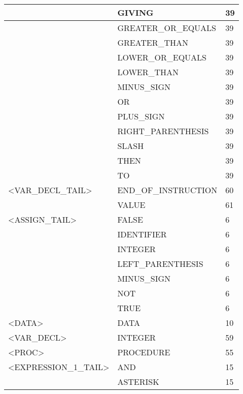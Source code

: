 \begin{longtable}{|l|l|l|}
                     &   GIVING               &   39 \\ \hline
                     &   GREATER\_OR\_EQUALS    &   39 \\ \hline
                     &   GREATER\_THAN         &   39 \\ \hline
                     &   LOWER\_OR\_EQUALS      &   39 \\ \hline
                     &   LOWER\_THAN           &   39 \\ \hline
                     &   MINUS\_SIGN           &   39 \\ \hline
                     &   OR                   &   39 \\ \hline
                     &   PLUS\_SIGN            &   39 \\ \hline
                     &   RIGHT\_PARENTHESIS    &   39 \\ \hline
                     &   SLASH                &   39 \\ \hline
                     &   THEN                 &   39 \\ \hline
                     &   TO                   &   39 \\ \hline
<VAR\_DECL\_TAIL>      &   END\_OF\_INSTRUCTION   &   60 \\ \hline
                     &   VALUE                &   61 \\ \hline
<ASSIGN\_TAIL>        &   FALSE                &   6 \\ \hline
                     &   IDENTIFIER           &   6 \\ \hline
                     &   INTEGER              &   6 \\ \hline
                     &   LEFT\_PARENTHESIS     &   6 \\ \hline
                     &   MINUS\_SIGN           &   6 \\ \hline
                     &   NOT                  &   6 \\ \hline
                     &   TRUE                 &   6 \\ \hline
<DATA>               &   DATA                 &   10 \\ \hline
<VAR\_DECL>           &   INTEGER              &   59 \\ \hline
<PROC>               &   PROCEDURE            &   55 \\ \hline
<EXPRESSION\_1\_TAIL>  &   AND                  &   15 \\ \hline
                     &   ASTERISK             &   15 \\ \hline

\end{longtable}
